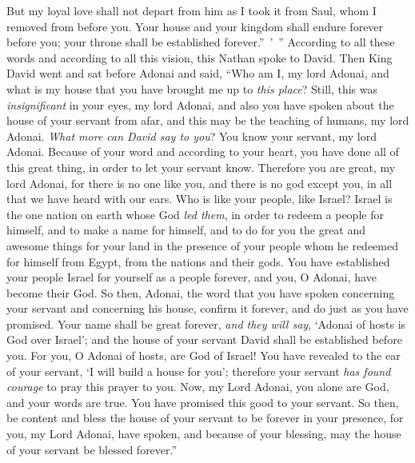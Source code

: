 \begin{biblechapter}
\verse But my loyal love shall not depart from him as I took it from Saul, whom I removed from before you.
\verse Your house and your kingdom shall endure forever before you; your throne shall be established forever.” ’ ”
 According to all these words and according to all this vision, this Nathan spoke to David.
\verse Then King David went and sat before Adonai and said, “Who am I, my lord Adonai, and what is my house that you have brought me up to \textit{this place}?
\verse Still, this was \textit{insignificant} in your eyes, my lord Adonai, and also you have spoken about the house of your servant from afar, and this may be the teaching of humans, my lord Adonai.
\verse \textit{What more can David say to you}? You know your servant, my lord Adonai.
\verse Because of your word and according to your heart, you have done all of this great thing, in order to let your servant know.
\verse Therefore you are great, my lord Adonai, for there is no one like you, and there is no god except you, in all that we have heard with our ears.
\verse Who is like your people, like Israel? Israel is the one nation on earth whose God \textit{led them}, in order to redeem a people for himself, and to make a name for himself, and to do for you the great and awesome things for your land in the presence of your people whom he redeemed for himself from Egypt, from the nations and their gods.
\verse You have established your people Israel for yourself as a people forever, and you, O Adonai, have become their God.
\verse So then, Adonai, the word that you have spoken concerning your servant and concerning his house, confirm it forever, and do just as you have promised.
\verse Your name shall be great forever, \textit{and they will say}, ‘Adonai of hosts is God over Israel’; and the house of your servant David shall be established before you.
\verse For you, O Adonai of hosts, are God of Israel! You have revealed to the ear of your servant, ‘I will build a house for you’; therefore your servant \textit{has found courage} to pray this prayer to you.
\verse Now, my Lord Adonai, you alone are God, and your words are true. You have promised this good to your servant.
\verse So then, be content and bless the house of your servant to be forever in your presence, for you, my Lord Adonai, have spoken, and because of your blessing, may the house of your servant be blessed forever.”
\end{biblechapter}

